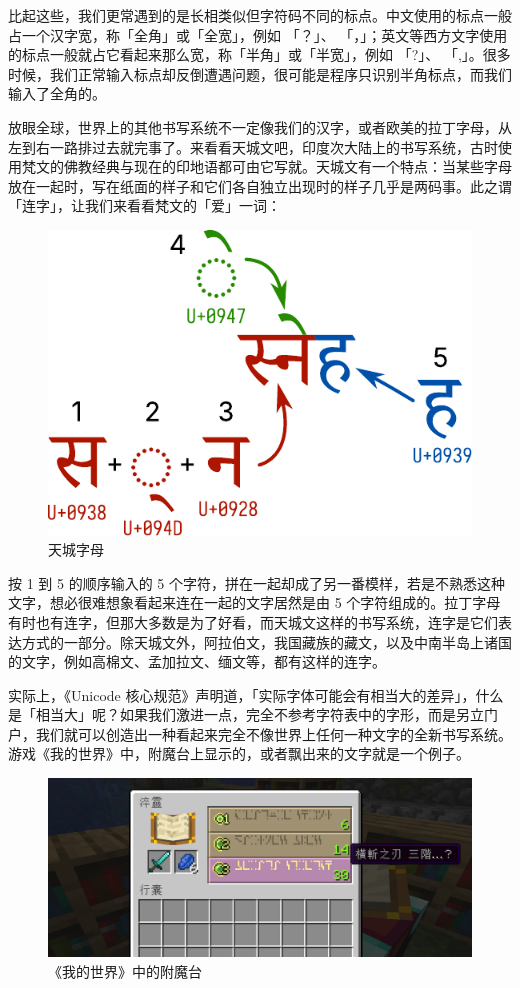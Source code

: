 \begin{note}
  比起这些，我们更常遇到的是长相类似但字符码不同的标点。中文使用的标点一般占一个汉字宽，称「全角」或「全宽」，例如  「？」、  「，」；英文等西方文字使用的标点一般就占它看起来那么宽，称「半角」或「半宽」，例如  「?」、  「,」。很多时候，我们正常输入标点却反倒遭遇问题，很可能是程序只识别半角标点，而我们输入了全角的。
\end{note}

放眼全球，世界上的其他书写系统不一定像我们的汉字，或者欧美的拉丁字母，从左到右一路排过去就完事了。来看看天城文吧，印度次大陆上的书写系统，古时使用梵文的佛教经典与现在的印地语都可由它写就。天城文有一个特点：当某些字母放在一起时，写在纸面的样子和它们各自独立出现时的样子几乎是两码事。此之谓「连字」，让我们来看看梵文的「爱」一词：

\begin{figure}[htb!]
  \centering
  \includegraphics[width=.5\textwidth]{assets/advanced/Devanagari.pdf}
  \caption{天城字母}
  \label{fig:Devanagari}
\end{figure}

按 1 到 5 的顺序输入的 5 个字符，拼在一起却成了另一番模样，若是不熟悉这种文字，想必很难想象看起来连在一起的文字居然是由 5 个字符组成的。拉丁字母有时也有连字，但那大多数是为了好看，而天城文这样的书写系统，连字是它们表达方式的一部分。除天城文外，阿拉伯文，我国藏族的藏文，以及中南半岛上诸国的文字，例如高棉文、孟加拉文、缅文等，都有这样的连字。

实际上，《Unicode 核心规范》声明道，「实际字体可能会有相当大的差异」，什么是「相当大」呢？如果我们激进一点，完全不参考字符表中的字形，而是另立门户，我们就可以创造出一种看起来完全不像世界上任何一种文字的全新书写系统。游戏《我的世界》中，附魔台上显示的，或者飘出来的文字就是一个例子。

\begin{figure}[htb!]
  \centering
  \includegraphics[width=.7\textwidth]{assets/advanced/EnchantingTable.png}
  \caption{《我的世界》中的附魔台}
  \label{fig:EnchantingTable}
\end{figure}


